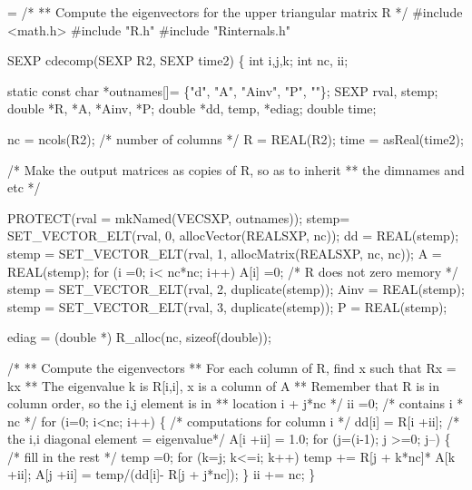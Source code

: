 \documentclass{article}
\begin{document}
\begin{nwchunk}
=
 /*
 ** Compute the eigenvectors for the upper triangular matrix R
 */
 #include <math.h>
 #include "R.h"
 #include "Rinternals.h"
 
 SEXP cdecomp(SEXP R2, SEXP time2) \{
     int i,j,k;
     int nc, ii;
     
     static const char *outnames[]= \{"d", "A", "Ainv", 
                                     "P", ""\};    
     SEXP rval, stemp;
     double *R, *A, *Ainv, *P;
     double *dd, temp, *ediag;
     double time;
 
     nc = ncols(R2);   /* number of columns */
     R = REAL(R2);
     time = asReal(time2);
 
     /* Make the output matrices as copies of R, so as to inherit
     **   the dimnames and etc
     */
     
     PROTECT(rval = mkNamed(VECSXP, outnames));
     stemp=  SET_VECTOR_ELT(rval, 0, allocVector(REALSXP, nc));
     dd = REAL(stemp);
     stemp = SET_VECTOR_ELT(rval, 1, allocMatrix(REALSXP, nc, nc));
     A = REAL(stemp);
     for (i =0; i< nc*nc; i++) A[i] =0;   /* R does not zero memory */
     stemp = SET_VECTOR_ELT(rval, 2, duplicate(stemp));
     Ainv = REAL(stemp);
     stemp = SET_VECTOR_ELT(rval, 3, duplicate(stemp));
     P = REAL(stemp);
    
     ediag = (double *) R_alloc(nc, sizeof(double));
     
     /* 
     **        Compute the eigenvectors
     **   For each column of R, find x such that Rx = kx
     **   The eigenvalue k is R[i,i], x is a column of A
     **  Remember that R is in column order, so the i,j element is in
     **   location i + j*nc
     */
     ii =0; /* contains i * nc */
     for (i=0; i<nc; i++) \{ /* computations for column i */
         dd[i] = R[i +ii];    /* the i,i diagonal element = eigenvalue*/
         A[i +ii] = 1.0;
         for (j=(i-1); j >=0; j--) \{  /* fill in the rest */
             temp =0;
             for (k=j; k<=i; k++) temp += R[j + k*nc]* A[k +ii];
             A[j +ii] = temp/(dd[i]- R[j + j*nc]);
         \}
         ii += nc;
     \}
     

\end{nwchunk}
\end{document}
